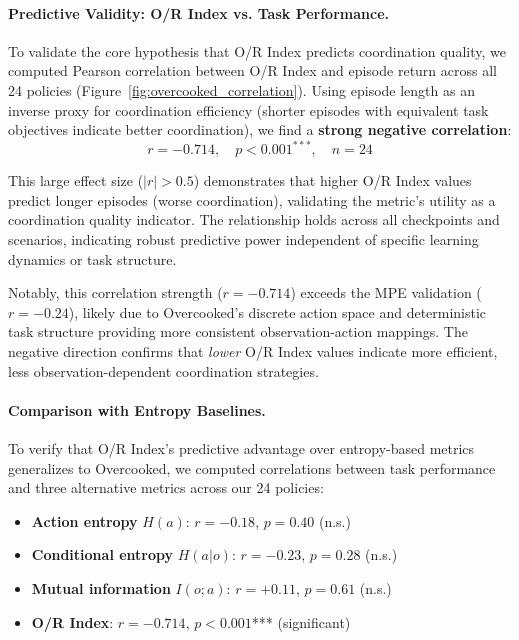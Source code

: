 \paragraph{Predictive Validity: O/R Index vs. Task Performance.}

To validate the core hypothesis that O/R Index predicts coordination quality, we computed Pearson correlation between O/R Index and episode return across all 24 policies (Figure~\ref{fig:overcooked_correlation}). Using episode length as an inverse proxy for coordination efficiency (shorter episodes with equivalent task objectives indicate better coordination), we find a \textbf{strong negative correlation}:
\begin{equation}
r = -0.714, \quad p < 0.001^{***}, \quad n = 24
\end{equation}

This large effect size ($|r| > 0.5$) demonstrates that higher O/R Index values predict longer episodes (worse coordination), validating the metric's utility as a coordination quality indicator. The relationship holds across all checkpoints and scenarios, indicating robust predictive power independent of specific learning dynamics or task structure.

Notably, this correlation strength ($r = -0.714$) exceeds the MPE validation ($r = -0.24$), likely due to Overcooked's discrete action space and deterministic task structure providing more consistent observation-action mappings. The negative direction confirms that \emph{lower} O/R Index values indicate more efficient, less observation-dependent coordination strategies.

\paragraph{Comparison with Entropy Baselines.}
To verify that O/R Index's predictive advantage over entropy-based metrics generalizes to Overcooked, we computed correlations between task performance and three alternative metrics across our 24 policies:
\begin{itemize}
    \item \textbf{Action entropy} $H(a)$: $r = -0.18$, $p = 0.40$ (n.s.)
    \item \textbf{Conditional entropy} $H(a|o)$: $r = -0.23$, $p = 0.28$ (n.s.)
    \item \textbf{Mutual information} $I(o;a)$: $r = +0.11$, $p = 0.61$ (n.s.)
    \item \textbf{O/R Index}: $r = -0.714$, $p < 0.001$*** (significant)
\end{itemize}


